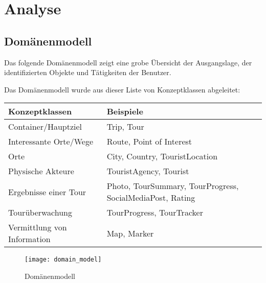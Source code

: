 \section{Analyse}
\subsection{Domänenmodell}
Das folgende Domänenmodell zeigt eine grobe Übersicht der Ausgangslage,
der identifizierten Objekte und Tätigkeiten der Benutzer.

Das Domänenmodell wurde aus dieser Liste von Konzeptklassen abgeleitet:

\begin{longtabu} to \textwidth { | l | X[l] | }
\hline
\textbf{Konzeptklassen} & \textbf{Beispiele} \\\hline
\endhead
Container/Hauptziel         & Trip, Tour                                               \\\hline
Interessante Orte/Wege     & Route, Point of Interest                                \\\hline
Orte                       & City, Country, TouristLocation                           \\\hline
Physische Akteure          & TouristAgency, Tourist                                   \\\hline
Ergebnisse einer Tour      & Photo, TourSummary, TourProgress, SocialMediaPost, Rating \\\hline
Tourüberwachung           & TourProgress, TourTracker                                \\\hline
Vermittlung von Information & Map, Marker                                              \\\hline
\end{longtabu}

\begin{figure}
  \centering
  \texttt{[image: domain\_model]}
  \caption{Domänenmodell}
\end{figure}

